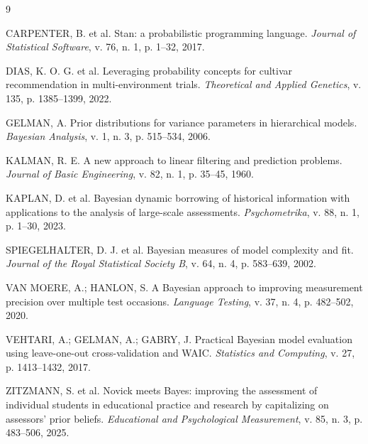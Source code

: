 \documentclass[12pt,a4paper]{article}
\begin{document}
\begin{thebibliography}{9}
\setlength{\itemsep}{0pt}
\footnotesize

CARPENTER, B. et al. Stan: a probabilistic programming language.
\textit{Journal of Statistical Software}, v. 76, n. 1, p. 1--32, 2017.

DIAS, K. O. G. et al. Leveraging probability concepts for cultivar recommendation in
multi-environment trials. \textit{Theoretical and Applied Genetics}, v. 135,
p. 1385--1399, 2022.

GELMAN, A. Prior distributions for variance parameters in hierarchical models.
\textit{Bayesian Analysis}, v. 1, n. 3, p. 515--534, 2006.

KALMAN, R. E. A new approach to linear filtering and prediction problems.
\textit{Journal of Basic Engineering}, v. 82, n. 1, p. 35--45, 1960.

KAPLAN, D. et al. Bayesian dynamic borrowing of historical information with applications to
the analysis of large-scale assessments. \textit{Psychometrika}, v. 88, n. 1, p. 1--30, 2023.

SPIEGELHALTER, D. J. et al. Bayesian measures of model complexity and fit.
\textit{Journal of the Royal Statistical Society B}, v. 64, n. 4, p. 583--639, 2002.

VAN MOERE, A.; HANLON, S. A Bayesian approach to improving measurement precision over
multiple test occasions. \textit{Language Testing}, v. 37, n. 4, p. 482--502, 2020.

VEHTARI, A.; GELMAN, A.; GABRY, J. Practical Bayesian model evaluation using
leave-one-out cross-validation and WAIC. \textit{Statistics and Computing}, v. 27,
p. 1413--1432, 2017.

ZITZMANN, S. et al. Novick meets Bayes: improving the assessment of individual students in
educational practice and research by capitalizing on assessors' prior beliefs.
\textit{Educational and Psychological Measurement}, v. 85, n. 3, p. 483--506, 2025.

\end{thebibliography}
\end{document}
